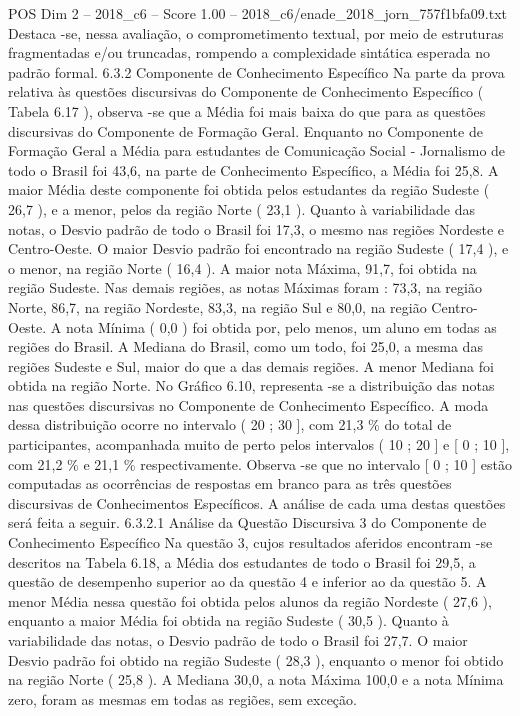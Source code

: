 \begin{textsample}{POS Dim 2 – 2018\_c6 – Score 1.00 – 2018\_c6/enade\_2018\_jorn\_757f1bfa09.txt}
Destaca -se, nessa avaliação, o comprometimento textual, por meio de estruturas fragmentadas e/ou truncadas, rompendo a complexidade sintática esperada no padrão formal. 6.3.2 Componente de Conhecimento Específico Na parte da prova relativa às questões discursivas do Componente de Conhecimento Específico ( Tabela 6.17 ), observa -se que a Média foi mais baixa do que para as questões discursivas do Componente de Formação Geral.
Enquanto no Componente de Formação Geral a Média para estudantes de Comunicação Social - Jornalismo de todo o Brasil foi 43,6, na parte de Conhecimento Específico, a Média foi 25,8.
A maior Média deste componente foi obtida pelos estudantes da região Sudeste ( 26,7 ), e a menor, pelos da região Norte ( 23,1 ).
Quanto à variabilidade das notas, o Desvio padrão de todo o Brasil foi 17,3, o mesmo nas regiões Nordeste e Centro-Oeste.
O maior Desvio padrão foi encontrado na região Sudeste ( 17,4 ), e o menor, na região Norte ( 16,4 ).
A maior nota Máxima, 91,7, foi obtida na região Sudeste.
Nas demais regiões, as notas Máximas foram : 73,3, na região Norte, 86,7, na região Nordeste, 83,3, na região Sul e 80,0, na região Centro-Oeste.
A nota Mínima ( 0,0 ) foi obtida por, pelo menos, um aluno em todas as regiões do Brasil.
A Mediana do Brasil, como um todo, foi 25,0, a mesma das regiões Sudeste e Sul, maior do que a das demais regiões.
A menor Mediana foi obtida na região Norte.
No Gráfico 6.10, representa -se a distribuição das notas nas questões discursivas no Componente de Conhecimento Específico.
A moda dessa distribuição ocorre no intervalo ( 20 ; 30 ], com 21,3 \% do total de participantes, acompanhada muito de perto pelos intervalos ( 10 ; 20 ] e [ 0 ; 10 ], com 21,2 \% e 21,1 \% respectivamente.
Observa -se que no intervalo [ 0 ; 10 ] estão computadas as ocorrências de respostas em branco para as três questões discursivas de Conhecimentos Específicos.
A análise de cada uma destas questões será feita a seguir. 6.3.2.1 Análise da Questão Discursiva 3 do Componente de Conhecimento Específico Na questão 3, cujos resultados aferidos encontram -se descritos na Tabela 6.18, a Média dos estudantes de todo o Brasil foi 29,5, a questão de desempenho superior ao da questão 4 e inferior ao da questão 5.
A menor Média nessa questão foi obtida pelos alunos da região Nordeste ( 27,6 ), enquanto a maior Média foi obtida na região Sudeste ( 30,5 ).
Quanto à variabilidade das notas, o Desvio padrão de todo o Brasil foi 27,7.
O maior Desvio padrão foi obtido na região Sudeste ( 28,3 ), enquanto o menor foi obtido na região Norte ( 25,8 ).
A Mediana 30,0, a nota Máxima 100,0 e a nota Mínima zero, foram as mesmas em todas as regiões, sem exceção.

\end{textsample}
